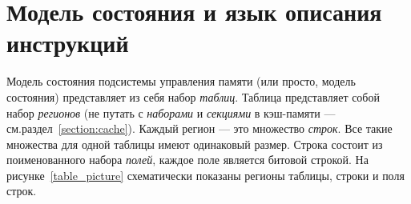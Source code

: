 %
%
%

\section{Модель состояния и язык описания инструкций}\label{sec:state_model_section}

Модель состояния подсистемы управления памяти (или просто, модель состояния)
представляет из себя набор \emph{таблиц}. Таблица представляет собой набор
\emph{регионов} (не путать с \emph{наборами} и \emph{секциями} в кэш-памяти --- см.раздел~\ref{section:cache}). Каждый регион --- это множество \emph{строк}. Все такие
множества для одной таблицы имеют одинаковый размер. Строка состоит из
поименованного набора \emph{полей}, каждое поле является битовой строкой. На
рисунке~\ref{table_picture} схематически показаны регионы таблицы, строки и поля
строк.

